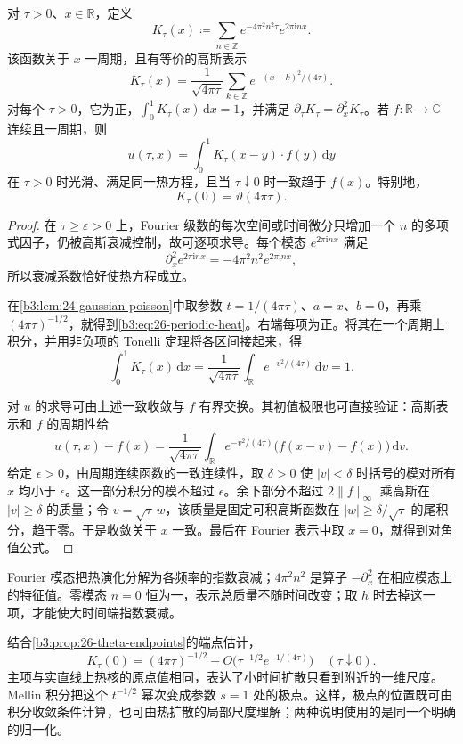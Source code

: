 \begin{proposition}[周期一热核的归一化]\label{b3:prop:26-periodic-heat}
对 \(\tau>0\)、\(x\in\mathbb R\)，定义
\[
 K_\tau(x)\coloneqq
 \sum_{n\in\mathbb Z}e^{-4\pi^2n^2\tau}e^{2\pi\mathrm inx}.
\]
该函数关于 \(x\) 一周期，且有等价的高斯表示
\begin{equation}\label{b3:eq:26-periodic-heat}
 K_\tau(x)=\frac1{\sqrt{4\pi\tau}}
       \sum_{k\in\mathbb Z}e^{-(x+k)^2/(4\tau)}.
\end{equation}
对每个 \(\tau>0\)，它为正，\(\int_0^1K_\tau(x)\,\mathrm dx=1\)，并满足 \(\partial_\tau K_\tau=\partial_x^2K_\tau\)。若 \(f:\mathbb R\to\mathbb C\) 连续且一周期，则
\[
 u(\tau,x)=\int_0^1 K_\tau(x-y)\cdot f(y)\,\mathrm dy
\]
在 \(\tau>0\) 时光滑、满足同一热方程，且当 \(\tau\downarrow0\) 时一致趋于 \(f(x)\)。特别地，
\[
 K_\tau(0)=\vartheta(4\pi\tau).
\]
\end{proposition}
\begin{proof}
在 \(\tau\ge\varepsilon>0\) 上，Fourier 级数的每次空间或时间微分只增加一个 \(n\) 的多项式因子，仍被高斯衰减控制，故可逐项求导。每个模态 \(e^{2\pi\mathrm inx}\) 满足
\[
 \partial_x^2e^{2\pi\mathrm inx}=-4\pi^2n^2e^{2\pi\mathrm inx},
\]
所以衰减系数恰好使热方程成立。

在\cref{b3:lem:24-gaussian-poisson}中取参数 \(t=1/(4\pi\tau)\)、\(a=x\)、\(b=0\)，再乘 \((4\pi\tau)^{-1/2}\)，就得到\eqref{b3:eq:26-periodic-heat}。右端每项为正。将其在一个周期上积分，并用非负项的 Tonelli 定理将各区间接起来，得
\[
 \int_0^1K_\tau(x)\,\mathrm dx
 =\frac1{\sqrt{4\pi\tau}}\int_{\mathbb R}e^{-v^2/(4\tau)}\,\mathrm dv=1.
\]

对 \(u\) 的求导可由上述一致收敛与 \(f\) 有界交换。其初值极限也可直接验证：高斯表示和 \(f\) 的周期性给
\[
 u(\tau,x)-f(x)
 =\frac1{\sqrt{4\pi\tau}}\int_{\mathbb R}
       e^{-v^2/(4\tau)}\bigl(f(x-v)-f(x)\bigr)\,\mathrm dv.
\]
给定 \(\epsilon>0\)，由周期连续函数的一致连续性，取 \(\delta>0\) 使 \(|v|<\delta\) 时括号的模对所有 \(x\) 均小于 \(\epsilon\)。这一部分积分的模不超过 \(\epsilon\)。余下部分不超过 \(2\|f\|_\infty\) 乘高斯在 \(|v|\ge\delta\) 的质量；令 \(v=\sqrt\tau\,w\)，该质量是固定可积高斯函数在 \(|w|\ge\delta/\sqrt\tau\) 的尾积分，趋于零。于是收敛关于 \(x\) 一致。最后在 Fourier 表示中取 \(x=0\)，就得到对角值公式。
\end{proof}

Fourier 模态把热演化分解为各频率的指数衰减；\(4\pi^2n^2\) 是算子 \(-\partial_x^2\) 在相应模态上的特征值。零模态 \(n=0\) 恒为一，表示总质量不随时间改变；取 \(h\) 时去掉这一项，才能使大时间端指数衰减。

\ProseParagraphBreak

结合\cref{b3:prop:26-theta-endpoints}的端点估计，
\[
 K_\tau(0)=(4\pi\tau)^{-1/2}
     +O\bigl(\tau^{-1/2}e^{-1/(4\tau)}\bigr)
 \quad(\tau\downarrow0).
\]
主项与实直线上热核的原点值相同，表达了小时间扩散只看到附近的一维尺度。Mellin 积分把这个 \(t^{-1/2}\) 幂次变成参数 \(s=1\) 处的极点。这样，极点的位置既可由积分收敛条件计算，也可由热扩散的局部尺度理解；两种说明使用的是同一个明确的归一化。
